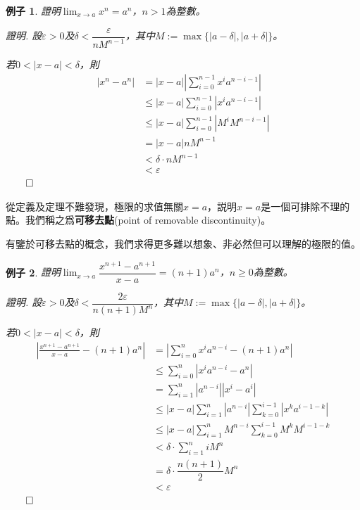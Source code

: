 \documentclass[12pt]{article}
\newtheorem*{example}{例子}
\renewenvironment*{proof}{\textit{證明.}}{\hfill$\qed$}
\begin{document}
    \begin{example}
        證明$\lim_{x\to a}x^n=a^n$，$n>1$為整數。
        
        \begin{proof}
            設$\varepsilon>0$及$\delta<\dfrac{\varepsilon}{nM^{n-1}}$，其中$M:=\max\{|a-\delta|,|a+\delta|\}$。

            若$0<|x-a|<\delta$，則\begin{align*}
                |x^n-a^n|&=|x-a||\sum_{i=0}^{n-1}x^ia^{n-i-1}|\\
                &\leq |x-a|\sum_{i=0}^{n-1}|x^ia^{n-i-1}|\\
                &\leq |x-a|\sum_{i=0}^{n-1}|M^iM^{n-i-1}|\\
                &=|x-a|nM^{n-1}\\
                &<\delta\cdot nM^{n-1}\\
                &<\varepsilon
            \end{align*}
        \end{proof}
    \end{example}

    從定義及定理不難發現，極限的求值無關$x=a$，説明$x=a$是一個可排除不理的點。我們稱之爲\textbf{可移去點}(point of removable discontinuity)。

    有鑒於可移去點的概念，我們求得更多難以想象、非必然但可以理解的極限的值。

    \begin{example}
        證明$\lim_{x\to a}\dfrac{x^{n+1}-a^{n+1}}{x-a}=(n+1)a^n$，$n\geq 0$為整數。
        
        \begin{proof}
            設$\varepsilon>0$及$\delta<\dfrac{2\varepsilon}{n(n+1)M^n}$，其中$M:=\max\{|a-\delta|,|a+\delta|\}$。

            若$0<|x-a|<\delta$，則\begin{align*}
                |\frac{x^{n+1}-a^{n+1}}{x-a}-(n+1)a^n|&=|\sum_{i=0}^{n}x^ia^{n-i}-(n+1)a^n|\\
                &\leq \sum_{i=0}^{n}|x^ia^{n-i}-a^n|\\
                &=\sum_{i=1}^{n}|a^{n-i}||x^i-a^i|\\
                &\leq |x-a|\sum_{i=1}^{n}|a^{n-i}|\sum_{k=0}^{i-1}|x^ka^{i-1-k}|\\
                &\leq |x-a|\sum_{i=1}^{n}M^{n-i}\sum_{k=0}^{i-1}M^kM^{i-1-k}\\
                &<\delta\cdot \sum_{i=1}^{n}iM^n\\
                &=\delta\cdot \dfrac{n(n+1)}{2}M^n\\
                &<\varepsilon
            \end{align*}
        \end{proof}
    \end{example}
\end{document}
